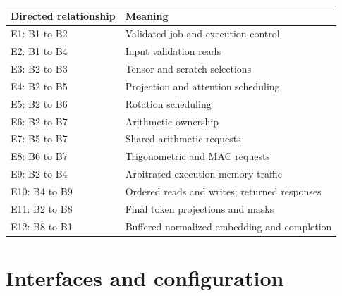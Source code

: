 \documentclass[11pt,a4paper]{article}
\begin{document}
{\small\renewcommand{\arraystretch}{1.18}\begin{longtable}{@{}L{0.24\textwidth}|L{0.7\textwidth}@{}}\toprule

\textbf{Directed relationship} & \textbf{Meaning}\\\midrule\endhead

E1: B1 to B2 & Validated job and execution control\\[2pt]\hline

E2: B1 to B4 & Input validation reads\\[2pt]\hline

E3: B2 to B3 & Tensor and scratch selections\\[2pt]\hline

E4: B2 to B5 & Projection and attention scheduling\\[2pt]\hline

E5: B2 to B6 & Rotation scheduling\\[2pt]\hline

E6: B2 to B7 & Arithmetic ownership\\[2pt]\hline

E7: B5 to B7 & Shared arithmetic requests\\[2pt]\hline

E8: B6 to B7 & Trigonometric and MAC requests\\[2pt]\hline

E9: B2 to B4 & Arbitrated execution memory traffic\\[2pt]\hline

E10: B4 to B9 & Ordered reads and writes; returned responses\\[2pt]\hline

E11: B2 to B8 & Final token projections and masks\\[2pt]\hline

E12: B8 to B1 & Buffered normalized embedding and completion\\[2pt]\hline

\bottomrule\end{longtable}}

\section{Interfaces and configuration}
\end{document}

